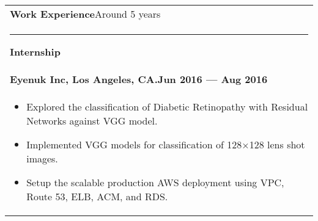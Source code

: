 \documentclass{article}
\begin{document}
\begin{tabular}{p{\dimexpr\linewidth-2\tabcolsep}}
    \textbf{\large{Work Experience}}\hfill Around 5 years \\
    \noindent\rule{\textwidth}{0.4pt}
    \bfseries \large{Internship}\\
    \smallskip
    {\bfseries Eyenuk Inc, Los Angeles, CA\@.\hfill Jun 2016 --- Aug 2016} \\
    \begin{itemize}
        \item Explored the classification of Diabetic Retinopathy with Residual Networks against VGG model.
        \item Implemented VGG models for classification of 128$\times$128 lens shot images.
        \item Setup the scalable production AWS deployment using VPC, Route 53, ELB, ACM, and RDS\@.
    \end{itemize}


\end{tabular}
\end{document}
